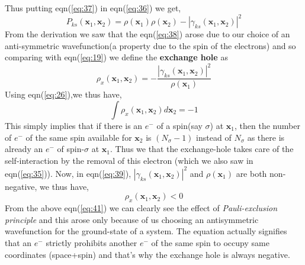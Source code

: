 \documentclass{article}
\begin{document}
\begin{Large}
\begin{flushleft}
  Thus putting eqn(\ref{eq:37}) in eqn(\ref{eq:36}) we get,
  \begin{equation}\label{eq:38}
   P_{ks}(\textbf{x}_1,\textbf{x}_2) = \rho(\textbf{x}_1)\rho(\textbf{x}_2)-|\gamma_{ks}(\textbf{x}_1,\textbf{x}_2)|^2
  \end{equation}
  From the derivation we saw that the eqn(\ref{eq:38}) arose due to our choice of an anti-symmetric wavefunction(a property due to the spin of the electrons) and so comparing  with eqn(\ref{eq:19}) we define the \textbf{exchange hole} as
  \begin{equation}\label{eq:39}
  \rho_x(\textbf{x}_1,\textbf{x}_2) =-\frac{|\gamma_{ks}(\textbf{x}_1,\textbf{x}_2)|^2}{\rho(\textbf{x}_1)} 
  \end{equation}
   Using eqn(\ref{eq:26}),we thus have,  
  \begin{equation}\label{eq:40}
  \displaystyle{\int}\rho_x(\textbf{x}_1,\textbf{x}_2)d\textbf{x}_2 = -1
  \end{equation}
  This simply implies that if there is an $e^-$ of a spin(say $\sigma$) at $\textbf{x}_1$, then the number of $e^-$ of the same spin available for $\textbf{x}_2$ is $(N_\sigma-1)$ instead of $N_\sigma$ as there is already an $e^-$ of spin-$\sigma$ at $\textbf{x}_1$. Thus we that the exchange-hole takes care of the self-interaction by the removal of this electron (which we also saw in eqn(\ref{eq:35})).
  Now, in eqn(\ref{eq:39}), $|\gamma_{ks}(\textbf{x}_1,\textbf{x}_2)|^2$ and $\rho(\textbf{x}_1)$ are both non-negative, we thus have,
  \begin{equation}\label{eq:41}
  \rho_x(\textbf{x}_1,\textbf{x}_2) < 0
  \end{equation}
  From the above eqn(\ref{eq:41}) we can clearly see the effect of \textit{Pauli-exclusion principle} and this arose only because of us choosing an antisymmetric wavefunction for the ground-state of a system. The equation actually signifies that an $e^-$ strictly prohibits another $e^-$ of the same spin to occupy same coordinates (space+spin) and that's why the exchange hole is always negative.
  

\end{flushleft}
\end{Large}
\end{document}
